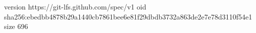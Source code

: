 version https://git-lfs.github.com/spec/v1
oid sha256:ebedbb4878b29a1440cb7861bee6e81f29dbdb3732a863de2e7e78d3110f54e1
size 696
